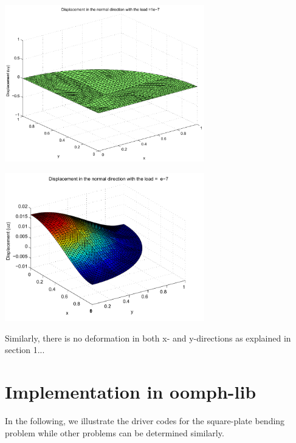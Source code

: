  
\begin{DoxyImage}
\includegraphics[width=0.65\textwidth]{Cir_Plate_y_direction}
\end{DoxyImage}


 
\begin{DoxyImage}
\includegraphics[width=0.65\textwidth]{Cir_Plate_z_direction}
\end{DoxyImage}


Similarly, there is no deformation in both x-\/ and y-\/directions as explained in section 1...



 

\hypertarget{index_impl}{}\section{Implementation in oomph-\/lib}\label{index_impl}
In the following, we illustrate the driver codes for the square-\/plate bending problem while other problems can be determined similarly.



